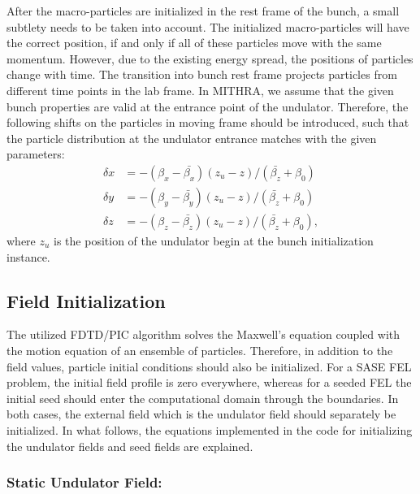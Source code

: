 After the macro-particles are initialized in the rest frame of the bunch, a small subtlety needs to be taken into account.
%
The initialized macro-particles will have the correct position, if and only if all of these particles move with the same momentum.
%
However, due to the existing energy spread, the positions of particles change with time.
%
The transition into bunch rest frame projects particles from different time points in the lab frame.
%
In MITHRA, we assume that the given bunch properties are valid at the entrance point of the undulator.
%
Therefore, the following shifts on the particles in moving frame should be introduced, such that the particle distribution at the undulator entrance matches with the given parameters:
%
\begin{align}
\delta x &= - ( \beta_x - \bar{\beta_x} ) ( z_u - z ) / ( \bar{\beta_z} + \beta_0 ) \\
\delta y &= - ( \beta_y - \bar{\beta_y} ) ( z_u - z ) / ( \bar{\beta_z} + \beta_0 ) \\
\delta z &= - ( \beta_z - \bar{\beta_z} ) ( z_u - z ) / ( \bar{\beta_z} + \beta_0 ),
\label{LorentzTransformDeltaR}
\end{align}
%
where $z_u$ is the position of the undulator begin at the bunch initialization instance.

\subsection{Field Initialization}
\label{fieldInitialization}

The utilized FDTD/PIC algorithm solves the Maxwell's equation coupled with the motion equation of an ensemble of particles.
%
Therefore, in addition to the field values, particle initial conditions should also be initialized.
%
For a SASE FEL problem, the initial field profile is zero everywhere, whereas for a seeded FEL the initial seed should enter the computational domain through the boundaries.
%
In both cases, the external field which is the undulator field should separately be initialized.
%
In what follows, the equations implemented in the code for initializing the undulator fields and seed fields are explained.

\subsubsection{Static Undulator Field:}

